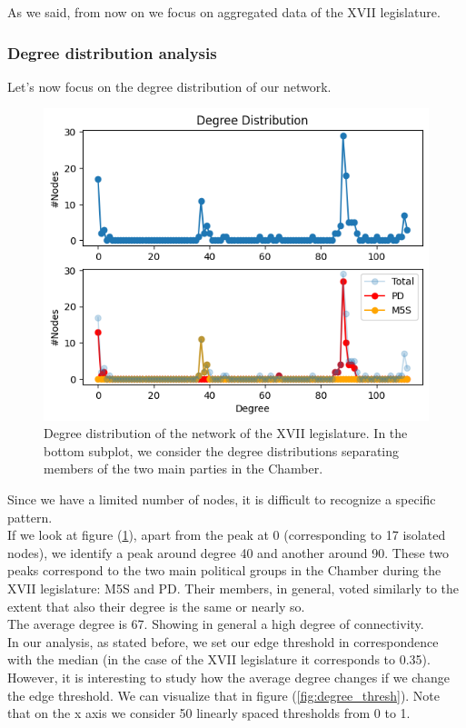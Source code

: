 As we said, from now on we focus on aggregated data of the XVII legislature.
\subsubsection{Degree distribution analysis} Let's now focus on the degree distribution of our network.
\begin{figure}[h]
  \centering
  \includegraphics[width=\linewidth]{img/degree_xvii_party.png}
  \caption{Degree distribution of the network of the XVII legislature. In the bottom subplot, we consider the degree distributions separating members of the two main parties in the Chamber.}
  \label{fig:degree_distrib}
\end{figure}

Since we have a limited number of nodes, it is difficult to recognize a specific pattern.\\
If we look at figure (\ref{fig:degree_distrib}), apart from the peak at 0 (corresponding to 17 isolated nodes), we identify a peak around degree 40 and another around 90. These two peaks correspond to the two main political groups in the Chamber during the XVII legislature: M5S and PD. Their members, in general, voted similarly to the extent that also their degree is the same or nearly so.\\
The average degree is 67. Showing in general a high degree of connectivity.\\

In our analysis, as stated before, we set our edge threshold in correspondence with the median (in the case of the XVII legislature it corresponds to 0.35). However, it is interesting to study how the average degree changes if we change the edge threshold.
We can visualize that in figure (\ref{fig:degree_thresh}). Note that on the x axis we consider 50 linearly spaced thresholds from 0 to 1. 

